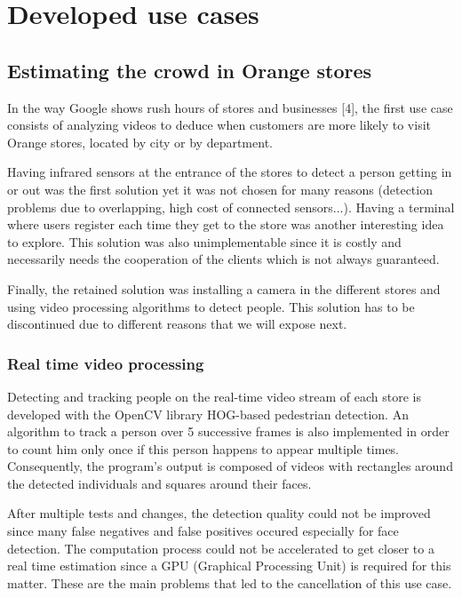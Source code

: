 \documentclass[11pt]{article}
\begin{document}
\section{Developed use cases}
\subsection{Estimating the crowd in Orange stores}

In the way \textsf{Google} shows rush hours of stores and businesses [4], the first use case consists of analyzing videos to deduce when customers are more likely to visit \textsf{Orange} stores, located by city or by department.

Having infrared sensors at the entrance of the stores to detect a person getting in or out was the first solution yet it was not chosen for many reasons (detection problems due to overlapping, high cost of connected sensors...).
Having a terminal where users register each time they get to the store was another interesting idea to explore. This solution was also unimplementable since it is costly and necessarily needs the cooperation of the clients which is not always guaranteed. 

Finally, the retained solution was installing a camera in the different stores and using video processing algorithms to detect people. This solution has to be discontinued due to different reasons that we will expose next.

\subsubsection{Real time video processing}

Detecting and tracking people on the real-time video stream of each store is developed with the \textsf{OpenCV} library HOG-based pedestrian detection. An algorithm to track a person over 5 successive frames is also implemented in order to count him only once if this person happens to appear multiple times. Consequently, the program's output is composed of videos with rectangles around the detected individuals and squares around their faces. 

After multiple tests and changes, the detection quality could not be improved since many false negatives and false positives occured especially for face detection. The computation process could not be accelerated to get closer to a real time estimation since a GPU (Graphical Processing Unit) is required for this matter. These are the main problems that led to the cancellation of this use case.
\end{document}
